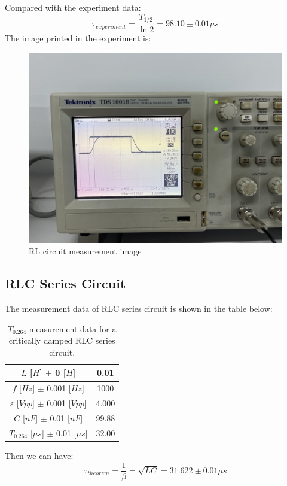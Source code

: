 \documentclass[12pt, a4paper]{article}
\begin{document}
Compared with the experiment data:
$$\tau_{experiment} = \frac{T_{1/2}}{\ln2} = 98.10\pm0.01\mu s$$
The image printed in the experiment is:
\begin{figure}[H]
	\centering
	\includegraphics[scale=0.06]{IMG_1830.jpg}
	\caption{RL circuit measurement image}
\end{figure}
\subsection{RLC Series Circuit}
The measurement data of RLC series circuit is shown in the table below:
\begin{table}[H]
	\begin{center}
	\begin{tabular}{|c|c|}
	\hline
	$L$ [$H$] $\pm$ 0 [$H$]	&	0.01	\\
	\hline
	$f$ [$Hz$] $\pm$ 0.001 [$Hz$]	&	1000	\\
	\hline
	$\varepsilon$ [$Vpp$] $\pm$ 0.001 [$Vpp$]	&	4.000	\\
	\hline
	$C$ [$nF$] $\pm$ 0.01 [$nF$]	&	99.88	\\
	\hline
	$T_{0.264}$ [$\mu s$] $\pm$ 0.01 [$\mu s$]	&	32.00	\\
	\hline
	\end{tabular}
	\caption{$T_{0.264}$ measurement data for a critically damped RLC series circuit.}
	\label{tab-3}
	\end{center}
\end{table}

Then we can have:
$$\tau_{theorem} = \frac{1}{\beta} = \sqrt{LC} = 31.622\pm0.01\mu s$$
\end{document}
